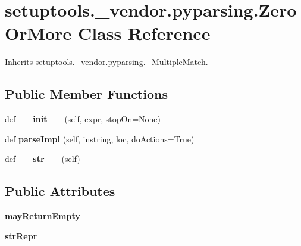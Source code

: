 \hypertarget{classsetuptools_1_1__vendor_1_1pyparsing_1_1_zero_or_more}{}\section{setuptools.\+\_\+vendor.\+pyparsing.\+Zero\+Or\+More Class Reference}
\label{classsetuptools_1_1__vendor_1_1pyparsing_1_1_zero_or_more}


Inherits \hyperlink{classsetuptools_1_1__vendor_1_1pyparsing_1_1___multiple_match}{setuptools.\+\_\+vendor.\+pyparsing.\+\_\+\+Multiple\+Match}.

\subsection*{Public Member Functions}
\begin{DoxyCompactItemize}
\item 
\mbox{\label{classsetuptools_1_1__vendor_1_1pyparsing_1_1_zero_or_more_a337db3762bba43f517e360a7d1ddd612}} 
def {\bfseries \+\_\+\+\_\+init\+\_\+\+\_\+} (self, expr, stop\+On=None)
\item 
\mbox{\label{classsetuptools_1_1__vendor_1_1pyparsing_1_1_zero_or_more_a5e30b20e2222b161e02ab007a6ba65fb}} 
def {\bfseries parse\+Impl} (self, instring, loc, do\+Actions=True)
\item 
\mbox{\label{classsetuptools_1_1__vendor_1_1pyparsing_1_1_zero_or_more_abda7d841e67ba2c6a087539a4c0542d3}} 
def {\bfseries \+\_\+\+\_\+str\+\_\+\+\_\+} (self)
\end{DoxyCompactItemize}
\subsection*{Public Attributes}
\begin{DoxyCompactItemize}
\item 
\mbox{\label{classsetuptools_1_1__vendor_1_1pyparsing_1_1_zero_or_more_aeba31b21b849e5f0181b320eb47b799a}} 
{\bfseries may\+Return\+Empty}
\item 
\mbox{\label{classsetuptools_1_1__vendor_1_1pyparsing_1_1_zero_or_more_a73399f1a89d8c0a1fb0ca90319876095}} 
{\bfseries str\+Repr}
\end{DoxyCompactItemize}

